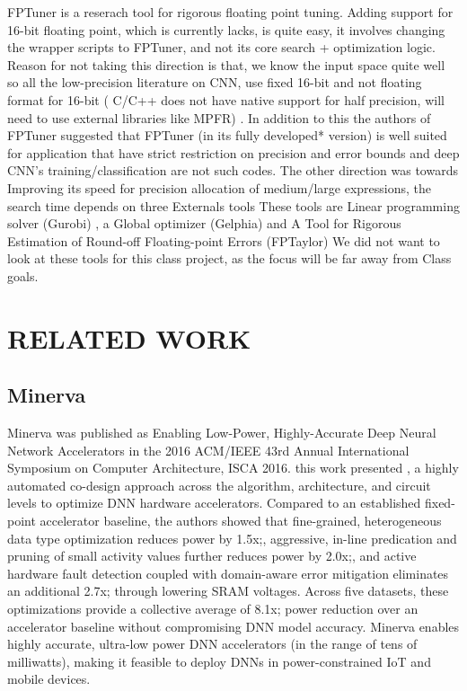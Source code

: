 \documentclass[letterpaper, 10 pt, conference]{ieeeconf}
\begin{document}
FPTuner is a reserach tool for rigorous floating point tuning. Adding support for 16-bit floating point, which is currently
lacks, is quite easy, it involves changing the wrapper scripts to FPTuner, and not its core search + optimization logic.
Reason for not taking this direction is that, we know the input space quite well so all the low-precision 
literature on CNN, use fixed 16-bit and not floating format for 16-bit  ( C/C++ does not have native support
for half precision, will need to use external libraries like MPFR) . In addition to this the authors of 
FPTuner suggested that FPTuner (in its fully developed* version) is well suited for application that have
strict restriction on precision and error bounds and deep CNN’s training/classification are not such codes.
The other direction was towards Improving its speed for precision allocation of medium/large expressions, 
the search time depends on three Externals tools These tools are Linear programming solver (Gurobi) ,
a Global optimizer (Gelphia) and A Tool for Rigorous Estimation of Round-off Floating-point Errors (FPTaylor) 
We did not want to look at these tools for this class project, as the focus will be far away from Class goals.

\section{RELATED WORK}

\subsection{Minerva}

Minerva was published as Enabling Low-Power, Highly-Accurate Deep Neural Network Accelerators in the 
2016 ACM/IEEE 43rd Annual International Symposium on Computer Architecture, ISCA 2016.
this work presented , a highly automated co-design approach across the algorithm, 
architecture, and circuit levels to optimize DNN hardware accelerators.
Compared to an established fixed-point accelerator baseline, the authors showed that fine-grained, 
heterogeneous data type optimization reduces power by 1.5x;, aggressive, in-line predication and 
pruning of small activity values further reduces power by 2.0x;, and 
active hardware fault detection coupled with domain-aware error mitigation eliminates an additional 2.7x; 
through lowering SRAM voltages. 
Across five datasets, these optimizations provide a collective average of 8.1x;
power reduction over an accelerator baseline without compromising DNN model accuracy.
Minerva enables highly accurate, ultra-low power DNN accelerators (in the range of tens of milliwatts), 
making it feasible to deploy DNNs in power-constrained IoT and mobile devices.
\end{document}
